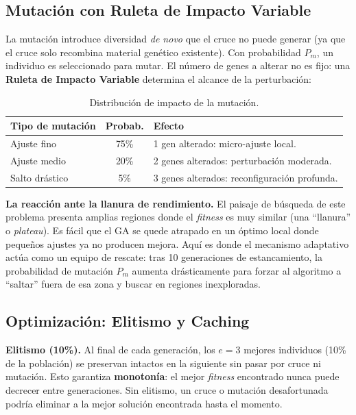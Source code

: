 \documentclass[12pt, a4paper]{article}
\begin{document}
\subsection{Mutación con Ruleta de Impacto Variable}

La mutación introduce diversidad \textit{de novo} que el cruce no puede generar (ya que
el cruce solo recombina material genético existente). Con probabilidad $P_m$, un
individuo es seleccionado para mutar. El número de genes a alterar no es fijo: una
\textbf{Ruleta de Impacto Variable} determina el alcance de la perturbación:

\renewcommand{\arraystretch}{1.2}
\begin{table}[H]
  \centering
  \caption{Distribución de impacto de la mutación.}
  \begin{tabular}{lcl}
    \toprule
    \textbf{Tipo de mutación} & \textbf{Probab.} & \textbf{Efecto}                              \\
    \midrule
    Ajuste fino               & 75\%             & 1 gen alterado: micro-ajuste local.          \\
    Ajuste medio              & 20\%             & 2 genes alterados: perturbación moderada.    \\
    Salto drástico            & 5\%              & 3 genes alterados: reconfiguración profunda. \\
    \bottomrule
  \end{tabular}
\end{table}
\renewcommand{\arraystretch}{1}

\textbf{La reacción ante la llanura de rendimiento.} El paisaje de búsqueda de este
problema presenta amplias regiones donde el \textit{fitness} es muy similar (una ``llanura''
o \textit{plateau}). Es fácil que el GA se quede atrapado en un óptimo local donde
pequeños ajustes ya no producen mejora. Aquí es donde el mecanismo adaptativo actúa como
un equipo de rescate: tras 10 generaciones de estancamiento, la probabilidad de mutación
$P_m$ aumenta drásticamente para forzar al algoritmo a ``saltar'' fuera de esa zona y
buscar en regiones inexploradas.

\subsection{Optimización: Elitismo y Caching}

\textbf{Elitismo (10\%).} Al final de cada generación, los $e=3$ mejores individuos
(10\% de la población) se preservan intactos en la siguiente sin pasar por cruce ni
mutación. Esto garantiza \textbf{monotonía}: el mejor \textit{fitness} encontrado nunca
puede decrecer entre generaciones. Sin elitismo, un cruce o mutación desafortunada
podría eliminar a la mejor solución encontrada hasta el momento.
\end{document}
